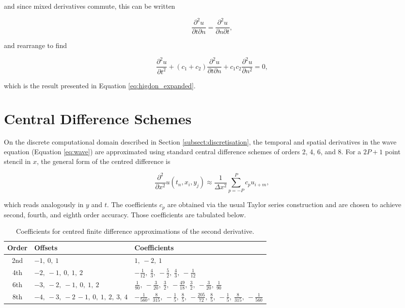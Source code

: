 \documentclass[final-report]{report-template}
\begin{document}
and since mixed derivatives commute, this can be written

\begin{equation}
     \frac{\partial^2 u}{\partial t \partial n } =  \frac{\partial^2 u}{\partial n \partial t },
\end{equation}

and rearrange to find

\begin{equation}
    \frac{\partial^2 u}{\partial t^2} + 
    (c_1 + c_2) \frac{\partial^2 u}{\partial t \partial n } + 
    c_1 c_2 \frac{\partial^2 u}{\partial n^2} = 0,
\end{equation}

which is the result presented in Equation \eqref{eq:higdon_expanded}.

\section{Central Difference Schemes}
\label{app:central_diff}

On the discrete computational domain described in Section \ref{subsect:discretisation}, the temporal and spatial derivatives in the wave equation (Equation \ref{eq:wave}) are approximated using standard central difference schemes of orders 2, 4, 6, and 8. For a $2P + 1$ point stencil in $x$, the general form of the centred difference is

\begin{equation}
    \frac {\partial^2 } {\partial x^2}u(t_n, x_i, y_j) \approx \frac {1} {\Delta x^2} \sum^P_{p=-P}c_p u_{i+m},
\end{equation}

which reads analogously in $y$ and $t$. The coefficients $c_p$ are obtained via the usual Taylor series construction and are chosen to achieve second, fourth, and eighth order accuracy. Those coefficients are tabulated below.

\begin{table}[!htp]
\centering
\begin{tabular}{|c|l|l|}
    \hline
    Order & Offsets & Coefficients \\
    \hline
    2nd & $-1,\ 0 ,\ 1$ & $1,\ -2,\ 1$\\[3pt]
    4th & $-2,\ -1,\ 0 ,\ 1,\ 2$ & $-\frac{1}{12},\ \frac{4}{3},\ -\frac{5}{2},\ \frac{4}{3},\ -\frac{1}{12}$\\[3pt]
    6th & $-3,\ -2,\ -1,\ 0 ,\ 1,\ 2$ & $\frac{1}{90},\ -\frac{3}{20},\ \frac{3}{2},\ -\frac{49}{18},\ \frac{3}{2},\ -\frac{3}{20},\ \frac{1}{90}$\\[3pt]
    8th & $-4,\ -3,\ -2\, -1,\ 0 ,\ 1,\ 2,\ 3,\ 4$ & $-\frac{1}{560},\ \frac{8}{315},\ -\frac{1}{5},\ \frac{8}{5},\ -\frac{205}{72},\ \frac{8}{5},\ -\frac{1}{5},\ \frac{8}{315},\ -\frac{1}{560}$ \\[3pt] \hline
\end{tabular}
\caption{Coefficients for centred finite difference approximations of the second derivative.}
\label{tab:fd_coefficients}
\end{table}
\end{document}
